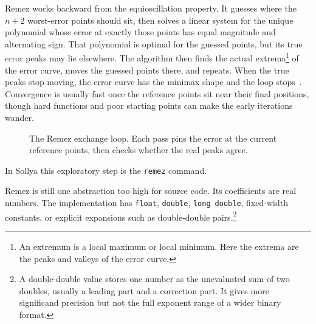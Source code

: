 \documentclass[manuscript, nonacm]{acmart}
\begin{document}
    Remez works backward from the equioscillation property. It guesses where the
    $n + 2$ worst-error points should sit, then solves a linear system for the
    unique polynomial whose error at exactly those points has equal magnitude and
    alternating sign. That polynomial is optimal for the guessed points, but its
    true error peaks may lie elsewhere. The algorithm then finds the actual
    extrema\footnote{An extremum is a local maximum or local minimum. Here the extrema are the peaks and valleys of the error curve.} of the error curve, moves the guessed points there, and repeats. When
    the true peaks stop moving, the error curve has the minimax shape and the loop
    stops~\cite{muller}. Convergence is usually fast once the reference points sit
    near their final positions, though hard functions and poor starting points can
    make the early iterations wander.

    \begin{figure}[H]
        \centering
        \caption{The Remez exchange loop. Each pass pins the error at the
        current reference points, then checks whether the real peaks agree.}
    \end{figure}

    In Sollya this exploratory step is the \texttt{remez} command.

    Remez is still one abstraction too high for source code. Its coefficients are
    real numbers. The implementation has \texttt{float}, \texttt{double},
    \texttt{long}~\texttt{double}, fixed-width constants, or explicit expansions
    such as double-double pairs.\footnote{A double-double value stores one number as the unevaluated sum of two doubles, usually a leading part and a correction part. It gives more significand precision but not the full exponent range of a wider binary format.}
\end{document}
